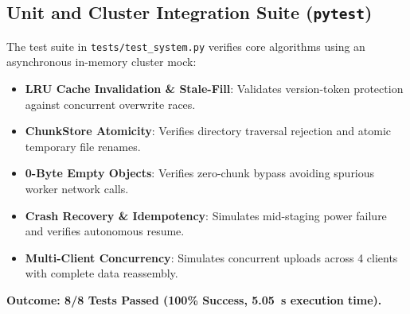 \documentclass[11pt,a4paper]{article}
\begin{document}
\subsection{Unit and Cluster Integration Suite (\texttt{pytest})}
The test suite in \texttt{tests/test_system.py} verifies core algorithms using an asynchronous in-memory cluster mock:
\begin{itemize}[noitemsep]
    \item \textbf{LRU Cache Invalidation \& Stale-Fill}: Validates version-token protection against concurrent overwrite races.
    \item \textbf{ChunkStore Atomicity}: Verifies directory traversal rejection and atomic temporary file renames.
    \item \textbf{0-Byte Empty Objects}: Verifies zero-chunk bypass avoiding spurious worker network calls.
    \item \textbf{Crash Recovery \& Idempotency}: Simulates mid-staging power failure and verifies autonomous resume.
    \item \textbf{Multi-Client Concurrency}: Simulates concurrent uploads across 4 clients with complete data reassembly.
\end{itemize}
\textbf{Outcome: 8/8 Tests Passed (100\% Success, 5.05~s execution time).}
\end{document}
